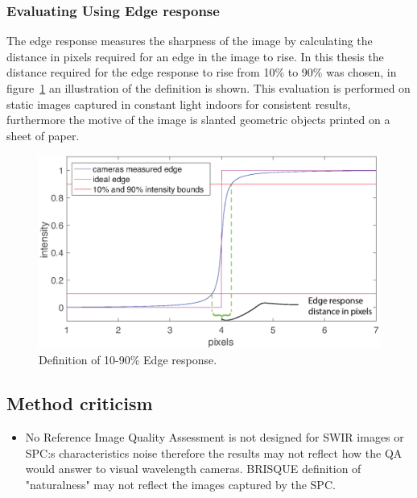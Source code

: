 \subsubsection{Evaluating Using Edge response}
The edge response measures the sharpness of the image by calculating the distance in pixels required for an edge in the image to rise. In this thesis the distance required for the edge response to rise from 10\% to 90\% was chosen, in figure~\ref{fig:edge_response_def} an illustration of the definition is shown. This evaluation is performed on static images captured in constant light indoors for consistent results, furthermore the motive of the image is slanted geometric objects printed on a sheet of paper.\cite{article:FOI_pres_sens}
 
\begin{figure}[H]
\includegraphics[width = 1\textwidth]{./result/edge_response.eps}
	\caption{Definition of 10-90\% Edge response.}
	\label{fig:edge_response_def}
\end{figure}

\pagebreak



\subsection{Method criticism}
\begin{itemize}
    \item No Reference Image Quality Assessment is not designed for SWIR images or SPC:s characteristics noise therefore the results may not reflect how the QA would answer to visual wavelength cameras. BRISQUE definition of "naturalness" may not reflect the images captured by the SPC. 
\end{itemize}

